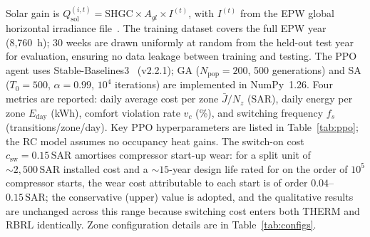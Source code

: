 \documentclass[3p,number]{elsarticle}
\newcommand{\csw}{c_{\mathrm{sw}}}
\newcommand{\Jbar}{\bar{J}}
\newcommand{\SAR}{\text{SAR}}
\begin{document}
Solar gain is $Q_{\mathrm{sol}}^{(i,t)}=\text{SHGC}\times A_{gl}\times I^{(t)}$, with $I^{(t)}$ from the EPW global horizontal irradiance file~\cite{EPW2023}.
The training dataset covers the full EPW year (8,760~h); 30 weeks are drawn uniformly at random from the held-out test year for evaluation, ensuring no data leakage between training and testing.
The PPO agent uses Stable-Baselines3~\cite{Raffin2021} (v2.2.1); GA ($N_{\text{pop}}=200$, 500 generations) and SA ($T_0=500$, $\alpha=0.99$, $10^4$ iterations) are implemented in NumPy~1.26.
Four metrics are reported: daily average cost per zone $\Jbar/N_z$ (SAR), daily energy per zone $E_{\mathrm{day}}$ (kWh), comfort violation rate $v_c$ (\%), and switching frequency $f_s$ (transitions/zone/day).
Key PPO hyperparameters are listed in Table~\ref{tab:ppo}; the RC model assumes no occupancy heat gains. The switch-on cost $\csw=0.15\,\SAR$ amortises compressor start-up wear: for a split unit of ${\sim}2{,}500\,\SAR$ installed cost and a ${\sim}15$-year design life rated for on the order of $10^{5}$ compressor starts, the wear cost attributable to each start is of order $0.04$--$0.15\,\SAR$; the conservative (upper) value is adopted, and the qualitative results are unchanged across this range because switching cost enters both THERM and RBRL identically.
Zone configuration details are in Table~\ref{tab:configs}.
 
\end{document}

